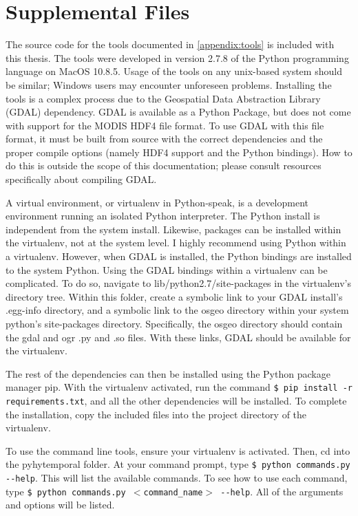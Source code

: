 \chapter{Supplemental Files}
\label{appendix:files}

The source code for the tools documented in \cref{appendix:tools} is included with this thesis. The tools were developed in version 2.7.8 of the Python programming language \autocite{python2.7.8} on MacOS 10.8.5. Usage of the tools on any unix-based system should be similar; Windows users may encounter unforeseen problems. Installing the tools is a complex process due to the Geospatial Data Abstraction Library (GDAL) dependency. GDAL is available as a Python Package, but does not come with support for the MODIS HDF4 file format. To use GDAL with this file format, it must be built from source with the correct dependencies and the proper compile options (namely HDF4 support and the Python bindings). How to do this is outside the scope of this documentation; please consult resources specifically about compiling GDAL.

A virtual environment, or virtualenv in Python-speak, is a development environment running an isolated Python interpreter. The Python install is independent from the system install. Likewise, packages can be installed within the virtualenv, not at the system level. I highly recommend using Python within a virtualenv. However, when GDAL is installed, the Python bindings are installed to the system Python. Using the GDAL bindings within a virtualenv can be complicated. To do so, navigate to lib/python2.7/site-packages in the virtualenv's directory tree. Within this folder, create a symbolic link to your GDAL install's .egg-info directory, and a symbolic link to the osgeo directory within your system python's site-packages directory. Specifically, the osgeo directory should contain the gdal and ogr .py and .so files. With these links, GDAL should be available for the virtualenv.

The rest of the dependencies can then be installed using the Python package manager pip. With the virtualenv activated, run the command \texttt{\small\$ pip install -r requirements.txt}, and all the other dependencies will be installed. To complete the installation, copy the included files into the project directory of the virtualenv.

To use the command line tools, ensure your virtualenv is activated. Then, cd into the pyhytemporal folder. At your command prompt, type \texttt{\small\$ python commands.py {{-}{-}help}}. This will list the available commands. To see how to use each command, type \texttt{\small\$ python commands.py $<$command\_name$>$ {{-}{-}help}}. All of the arguments and options will be listed.

